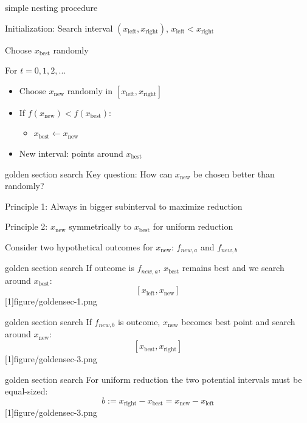 \documentclass[11pt,compress,t,notes=noshow, xcolor=table]{beamer}
\newcommand{\xleft}{x_{\text{left}}}
\newcommand{\xright}{x_{\text{right}}}
\newcommand{\xnew}{x_{\text{new}}}
\newcommand{\xbest}{x_{\text{best}}}
\begin{document}
\begin{framei}{simple nesting procedure}
\item Initialization: Search interval  $(\xleft, \xright)$, $\xleft < \xright$
\item Choose $\xbest$ randomly
\item For $t = 0, 1, 2, ...$
\begin{itemize}
\item Choose $\xnew$ randomly in $[\xleft, \xright]$
\item If $f(\xnew) < f(\xbest)$:
\begin{itemize}
\item $\xbest \leftarrow \xnew$
\end{itemize}
\item New interval: points around $\xbest$
\end{itemize}
\end{framei}


\begin{framev}[align=top]{golden section search}
Key question: How can $\xnew$ be chosen better than randomly?
\begin{itemizeM}
\item Principle 1: Always in bigger subinterval to maximize reduction
\item Principle 2: $\xnew$ symmetrically to $\xbest$ for uniform reduction
\end{itemizeM}
\vspace{-1.25cm}
Consider two hypothetical outcomes for $\xnew$: $f_{new, a}$ and $f_{new, b}$
\end{framev}


\begin{framev}[align=top]{golden section search}
If outcome is $f_{new, a}$, $\xbest$ remains best and we search around $\xbest$: $$[\xleft, \xnew]$$
\imageFixed{1cm}{2.5cm}[1]{figure/goldensec-1.png}
\end{framev}


\begin{framev}[align=top]{golden section search}
If $f_{new, b}$ is outcome, $\xnew$ becomes best point and search around $\xnew$: $$[\xbest, \xright]$$
\imageFixed{1cm}{2.5cm}[1]{figure/goldensec-3.png}
\end{framev}


\begin{framev}[align=top]{golden section search}
For uniform reduction the two potential intervals must be equal-sized:
$$b := \xright - \xbest = \xnew - \xleft$$
\imageFixed{1cm}{2.5cm}[1]{figure/goldensec-3.png}
\end{framev}
\end{document}
